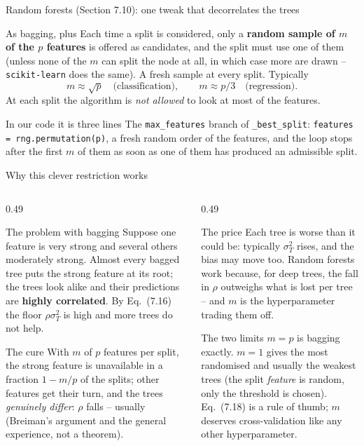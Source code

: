 \documentclass[10pt,aspectratio=169]{beamer}
\begin{document}
\begin{frame}{Random forests (Section 7.10): one tweak that decorrelates the trees}
\begin{block}{As bagging, plus}
Each time a split is considered, only a \textbf{random sample of $m$ of the $p$
features} is offered as candidates, and the split must use one of them
(unless none of the $m$ can split the node at all, in which case more are
drawn -- \texttt{scikit-learn} does the same).  A fresh sample at every
split.  Typically
\[
  m\approx\sqrt{p}\quad\text{(classification)},\qquad m\approx p/3\quad\text{(regression)}.
  \tag{7.18}
\]
At each split the algorithm is \emph{not allowed} to look at most of the
features.
\end{block}
\begin{block}{In our code it is three lines}
The \texttt{max\_features} branch of \texttt{\_best\_split}:
\texttt{features = rng.permutation(p)}, a fresh random order of the
features, and the loop stops after the first $m$ of them as soon as one of
them has produced an admissible split.
\end{block}
\end{frame}

\begin{frame}{Why this clever restriction works}
\small
\begin{columns}[T]
\begin{column}{0.49\textwidth}
\begin{block}{The problem with bagging}
Suppose one feature is very strong and several others moderately strong.
Almost every bagged tree puts the strong feature at its root; the trees look
alike and their predictions are \textbf{highly correlated}.  By Eq.\ (7.16)
the floor $\rho\sigma_T^2$ is high and more trees do not help.
\end{block}
\begin{block}{The cure}
With $m$ of $p$ features per split, the strong feature is unavailable in a
fraction $1-m/p$ of the splits; other features get their turn, and the trees
\emph{genuinely differ}: $\rho$ falls -- usually (Breiman's argument and
the general experience, not a theorem).
\end{block}
\end{column}
\begin{column}{0.49\textwidth}
\begin{block}{The price}
Each tree is worse than it could be: typically $\sigma_T^2$ rises, and the
bias may move too.  Random forests work because, for deep trees, the fall
in $\rho$ outweighs what is lost per tree -- and $m$ is the hyperparameter
trading them off.
\end{block}
\begin{block}{The two limits}
$m=p$ is bagging exactly.  $m=1$ gives the most randomised and usually the
weakest trees (the split \emph{feature} is random, only the threshold is
chosen).  Eq.\ (7.18) is a rule of thumb; $m$ deserves cross-validation
like any other hyperparameter.
\end{block}
\end{column}
\end{columns}
\end{frame}
\end{document}
